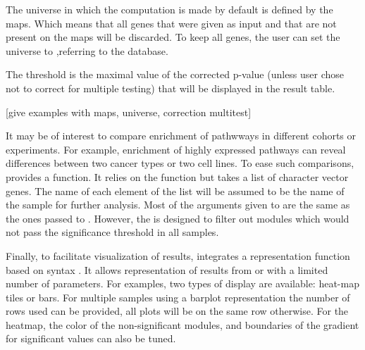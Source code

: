 \documentclass[article]{jss}
\begin{document}
The universe in which the computation is made by default is defined by the maps. Which means that all genes that were given as input and that are not present on the maps will be discarded. To keep all genes, the user can set the universe to ,referring to the database.

The threshold is the maximal value of the corrected p-value (unless user chose not to correct for multiple testing) that will be displayed in the result table.

[give examples with maps, universe, correction multitest]

It may be of interest to compare enrichment of pathwways in different cohorts or experiments. For example, enrichment of highly expressed pathways can reveal differences between two cancer types or two cell lines.
To ease such comparisons,  provides a  function. It relies on the  function but takes a list of character vector genes. The name of each element of the list will be assumed to be the name of the sample for further analysis.
Most of the arguments given to  are the same as the ones passed to . However, the  is designed to filter out modules which would not pass the significance threshold in all samples.   

Finally, to facilitate visualization of results,  integrates a representation function based on  syntax \citep{ggplot2}. It allows representation of results from  or  with a limited number of parameters. For examples, two types of display are available: heat-map tiles or bars. For multiple samples using a barplot representation the number of rows used can be provided, all plots will be on the same row otherwise. For the heatmap, the color of the non-significant modules, and boundaries of the gradient for significant values can also be tuned.
\end{document}
